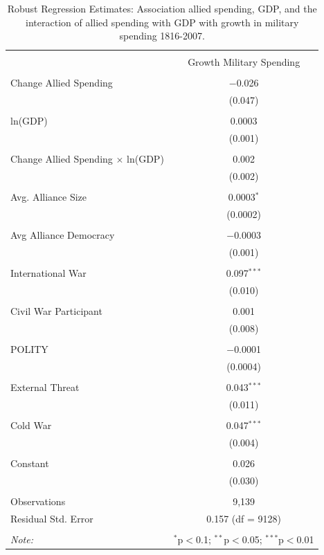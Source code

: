 \documentclass[12pt]{article}
\begin{document}
\begin{table}[!htbp] \centering 
\begin{tabular}{@{\extracolsep{5pt}}lc} 
\\[-1.8ex]\hline 
\hline \\[-1.8ex] 
  & Growth Military Spending \\ 
\hline \\[-1.8ex] 
 Change Allied Spending & $-$0.026 \\ 
  & (0.047) \\ 
  & \\ 
 ln(GDP) & 0.0003 \\ 
  & (0.001) \\ 
  & \\ 
 Change Allied Spending $\times$ ln(GDP) & 0.002 \\ 
  & (0.002) \\ 
  & \\ 
 Avg. Alliance Size & 0.0003$^{*}$ \\ 
  & (0.0002) \\ 
  & \\ 
 Avg Alliance Democracy & $-$0.0003 \\ 
  & (0.001) \\ 
  & \\ 
 International War & 0.097$^{***}$ \\ 
  & (0.010) \\ 
  & \\ 
 Civil War Participant & 0.001 \\ 
  & (0.008) \\ 
  & \\ 
 POLITY & $-$0.0001 \\ 
  & (0.0004) \\ 
  & \\ 
 External Threat & 0.043$^{***}$ \\ 
  & (0.011) \\ 
  & \\ 
 Cold War & 0.047$^{***}$ \\ 
  & (0.004) \\ 
  & \\ 
 Constant & 0.026 \\ 
  & (0.030) \\ 
\hline \\[-1.8ex] 
Observations & 9,139 \\ 
Residual Std. Error & 0.157 (df = 9128) \\ 
\hline 
\hline \\[-1.8ex] 
\textit{Note:}  & \multicolumn{1}{r}{$^{*}$p$<$0.1; $^{**}$p$<$0.05; $^{***}$p$<$0.01} \\ 
\end{tabular} 
\caption{Robust Regression Estimates: Association allied spending, GDP, and the interaction of allied spending with GDP with growth in military spending 1816-2007.}
\label{tab:rreg-res}
\end{table}
\end{document}
